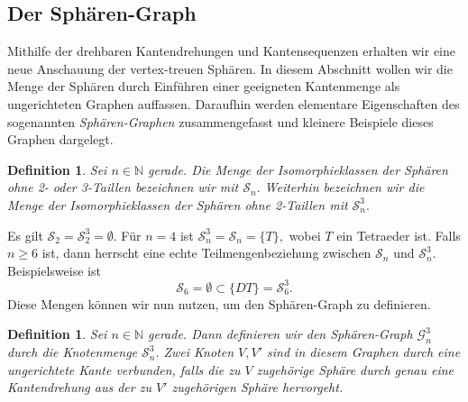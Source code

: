 \documentclass[12pt,titlepage,twoside,cleardoublepage]{article}
\theoremstyle{nummermitklammern}
\newtheorem{definition}[temp]{Definition}
\newtheorem{definition}[zahl]{Definition}
\numberwithin{equation}{section}
\begin{document}
\subsection{Der Sphären-Graph}
Mithilfe der drehbaren Kantendrehungen und Kantensequenzen erhalten wir eine neue Anschauung der vertex-treuen Sphären. In diesem Abschnitt wollen wir die Menge der Sphären durch Einführen einer geeigneten Kantenmenge als ungerichteten Graphen auffassen. Daraufhin werden elementare Eigenschaften des sogenannten \emph{Sphären-Graphen} zusammengefasst und kleinere Beispiele dieses Graphen dargelegt. 

\begin{definition}
Sei $n\in \mathbb{N}$ gerade. Die Menge der Isomorphieklassen der Sphären ohne 2- oder 3-Taillen bezeichnen wir mit $\mathcal{S}_n.$ Weiterhin bezeichnen wir die Menge der Isomorphieklassen der Sphären ohne 2-Taillen mit $\mathcal{S}_n^3.$
\end{definition} 
 Es gilt $\mathcal{S}_2=\mathcal{S}_2^3=\emptyset.$ 
 Für $n=4$ ist $\mathcal{S}_n^3=\mathcal{S}_n=\{T\},$ wobei $T$ ein Tetraeder ist.
 Falls $n\geq 6$ ist, dann herrscht eine echte Teilmengenbeziehung zwischen $\mathcal{S}_n$ und $\mathcal{S}_n^3.$ Beispielsweise ist 
 \[
 \mathcal{S}_6=\emptyset \subset \{DT\}=\mathcal{S}_6^3.
 \]
 Diese Mengen können wir nun nutzen, um den Sphären-Graph zu definieren. 
 \begin{definition}
Sei $n\in \mathbb{N}$ gerade. Dann definieren wir den \emph{Sphären-Graph} $\mathcal{G}^3_n$ durch die Knotenmenge $\mathcal{S}^3_n.$ Zwei Knoten $V,V'$ sind in diesem Graphen durch eine ungerichtete Kante verbunden, falls die zu $V$ zugehörige Sphäre durch genau eine Kantendrehung aus der zu $V'$ zugehörigen Sphäre hervorgeht. 
 \end{definition}
\end{document}
